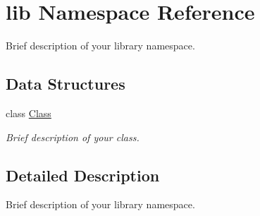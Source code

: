 \hypertarget{namespacelib}{\section{lib Namespace Reference}
\label{namespacelib}
}


Brief description of your library namespace.  


\subsection*{Data Structures}
\begin{DoxyCompactItemize}
\item 
class \hyperlink{classlib_1_1Class}{Class}
\begin{DoxyCompactList}\small\item\em Brief description of your class. \end{DoxyCompactList}\end{DoxyCompactItemize}


\subsection{Detailed Description}
Brief description of your library namespace. 